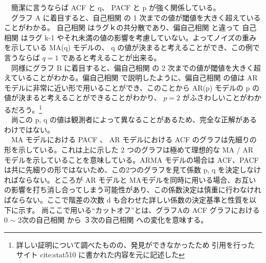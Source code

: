 \documentclass[dvipdfmx]{scrartcl}
\begin{document}
　簡潔に言うならば ACF と q、 PACF と p が強く関係している。\\
　グラフ A に着目すると、自己相関 の 1 次までの値が閾値を大きく超えていることがわかる。 自己相関 はラグｋの共分散であり、偏自己相関 と違って 自己相関 はラグ k-1 やそれ未満の値の影響を考慮していない。よってノイズの重みを示している MA(q) モデルの、 q の値が決まると考えることができ、この例で言うならば \(q = 1\) であると考えることが出来る。\\
　同様にグラフ B に着目すると、偏自己相関 の 2 次までの値が閾値を大きく超えていることがわかる。偏自己相関 で説明したように、偏自己相関 の値は AR モデルに非常に近い形で用いることができ、このことから AR(p) モデルの p の値が決まると考えることができることがわかり、 \(p = 2\) がふさわしいことがわかるだろう。\footnote{詳しい証明について調べたものの、発見ができなかったため 引用を行ったサイト cite:stat510 に書かれた内容を元に記述した}\\
　尚この p, q の値は観測者によって異なることがあるため、完全な正解があるわけではない。\\
　MA モデルにおける PACF 、 AR モデルにおける ACF のグラフは先細りの形を示している。これは上に示した 2 つのグラフは極めて理想的な MA / AR モデルを示していることを意味している。ARMA モデルの場合は ACF、PACF は共に先細りの形ではないため、この2つのグラフを見て係数 p, q を決定しなければならない。ところが AR モデルと MAモデルを同時に用いる場合、お互いの影響を打ち消し合ってしまう可能性があり、この係数決定は慎重に行わなければならない。ここで階差の次数 d も合わせた詳しい係数の決定基準と性質を以下に示す。\cite{acf-pacf} 尚ここで用いる``カットオフ''とは、グラフAの ACF グラフにおける 0 \(\sim\) 2次の自己相関 から ３次の自己相関 への変化を意味する。\\
\end{document}
